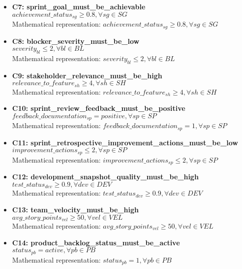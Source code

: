 \documentclass{article}
\begin{document}
\begin{itemize}
    \item \textbf{C7: sprint\_goal\_must\_be\_achievable} \\
    $achievement\_status_{sg} \geq 0.8, \forall sg \in SG$ \\
    Mathematical representation: $achievement\_status_{sg} \geq 0.8, \forall sg \in SG$

    \item \textbf{C8: blocker\_severity\_must\_be\_low} \\
    $severity_{bl} \leq 2, \forall bl \in BL$ \\
    Mathematical representation: $severity_{bl} \leq 2, \forall bl \in BL$

    \item \textbf{C9: stakeholder\_relevance\_must\_be\_high} \\
    $relevance\_to\_feature_{sh} \geq 4, \forall sh \in SH$ \\
    Mathematical representation: $relevance\_to\_feature_{sh} \geq 4, \forall sh \in SH$

    \item \textbf{C10: sprint\_review\_feedback\_must\_be\_positive} \\
    $feedback\_documentation_{sp} = positive, \forall sp \in SP$ \\
    Mathematical representation: $feedback\_documentation_{sp} = 1, \forall sp \in SP$

    \item \textbf{C11: sprint\_retrospective\_improvement\_actions\_must\_be\_low} \\
    $improvement\_actions_{sp} \leq 2, \forall sp \in SP$ \\
    Mathematical representation: $improvement\_actions_{sp} \leq 2, \forall sp \in SP$

    \item \textbf{C12: development\_snapshot\_quality\_must\_be\_high} \\
    $test\_status_{dev} \geq 0.9, \forall dev \in DEV$ \\
    Mathematical representation: $test\_status_{dev} \geq 0.9, \forall dev \in DEV$

    \item \textbf{C13: team\_velocity\_must\_be\_high} \\
    $avg\_story\_points_{vel} \geq 50, \forall vel \in VEL$ \\
    Mathematical representation: $avg\_story\_points_{vel} \geq 50, \forall vel \in VEL$

    \item \textbf{C14: product\_backlog\_status\_must\_be\_active} \\
    $status_{pb} = active, \forall pb \in PB$ \\
    Mathematical representation: $status_{pb} = 1, \forall pb \in PB$
\end{itemize}
\end{document}
